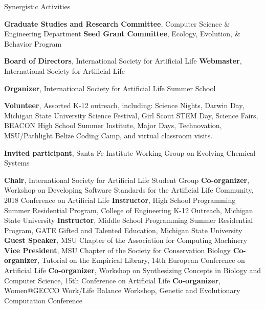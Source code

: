 \begin{rubric}{Synergistic Activities}

\entry*[2020 -- Present] \textbf{Graduate Studies and Research Committee}, Computer Science \& Engineering Department
\entry*[2020 -- Present] \textbf{Seed Grant Committee}, Ecology, Evolution, \& Behavior Program

%
\entry*[2019 -- Present] \textbf{Board of Directors}, International Society for Artificial Life 
\entry*[2019 -- Present] \textbf{Webmaster}, International Society for Artificial Life 

\entry*[2021 -- Present] \textbf{Organizer}, International Society for Artificial Life Summer School

\entry*[2014 -- Present] \textbf{Volunteer}, Assorted K-12 outreach, including: Science Nights, Darwin Day, Michigan State University Science Festival, Girl Scout STEM Day, Science Fairs, BEACON High School Summer Institute, Major Days, Technovation, MSU/Pathlight Belize Coding Camp, and virtual classroom visits.  

\entry*[2019] \textbf{Invited participant}, Santa Fe Institute Working Group on Evolving Chemical Systems

\entry*[2016 -- 2019] \textbf{Chair}, International Society for Artificial Life Student Group 
%
\entry*[2018] \textbf{Co-organizer}, Workshop on Developing Software Standards for the Artificial Life Community, 2018 Conference on Artificial Life
%
\entry*[2017, 2018] \textbf{Instructor}, High School Programming Summer Residential Program, College of Engineering K-12 Outreach, Michigan State University
%
\entry*[2018] \textbf{Instructor}, Middle School Programming Summer Residential Program, GATE Gifted and Talented Education, Michigan State University
%
\entry*[2016 -- 2018] \textbf{Guest Speaker}, MSU Chapter of the Association for Computing Machinery
%
\entry*[2015 -- 2017] \textbf{Vice President}, MSU Chapter of the Society for Conservation Biology 
%
\entry*[2017] \textbf{Co-organizer}, Tutorial on the Empirical Library, 14th European Conference on Artificial Life
%
\entry*[2016] \textbf{Co-organizer}, Workshop on Synthesizing Concepts in Biology and Computer Science, 15th Conference on Artificial Life 
%
\entry*[2015] \textbf{Co-organizer}, Women@GECCO Work/Life Balance Workshop, Genetic and Evolutionary Computation Conference 
%

%
\\


\end{rubric}
